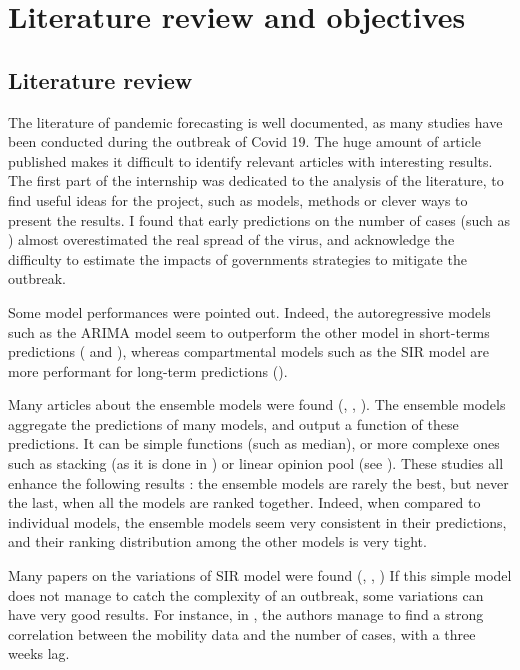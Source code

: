 \section{Literature review and objectives}

\subsection{Literature review}

The literature of pandemic forecasting is well documented, as many studies have been conducted during the outbreak of Covid 19. 
The huge amount of article published makes it difficult to identify relevant articles with interesting results. 
The first part of the internship was dedicated to the analysis of the literature, to find useful ideas for the project, such as models, methods or clever ways to present the results. 
I found that early predictions on the number of cases (such as \cite{gardner2020intervention}) almost overestimated the real spread of the virus, and acknowledge the difficulty to estimate the impacts of governments strategies to mitigate the outbreak. 

Some model performances were pointed out. 
Indeed, the autoregressive models such as the ARIMA model seem to outperform the other model in short-terms predictions (\cite{kufel2020arima} and \cite{shang2021regional}), whereas compartmental models such as the SIR model are more performant for long-term predictions (\cite{rahmandad2022enhancing}).

Many articles about the ensemble models were found (\cite{cramer2022evaluation}, \cite{reich2019accuracy}, \cite{howerton2023evaluation}). 
The ensemble models aggregate the predictions of many models, and output a function of these predictions. 
It can be simple functions (such as median), or more complexe ones such as stacking (as it is done in \cite{reich2019accuracy}) or linear opinion pool (see \cite{howerton2023evaluation}).
These studies all enhance the following results : the ensemble models are rarely the best, but never the last, when all the models are ranked together. 
Indeed, when compared to individual models, the ensemble models seem very consistent in their predictions, and their ranking distribution among the other models is very tight. 

Many papers on the variations of SIR model were found (\cite{gerlee2021predicting}, \cite{hult2020estimates}, \cite{sjodin2020covid})
If this simple model does not manage to catch the complexity of an outbreak, some variations can have very good results. 
For instance, in \cite{gerlee2021predicting}, the authors manage to find a strong correlation between the mobility data and the number of cases, with a three weeks lag. 

